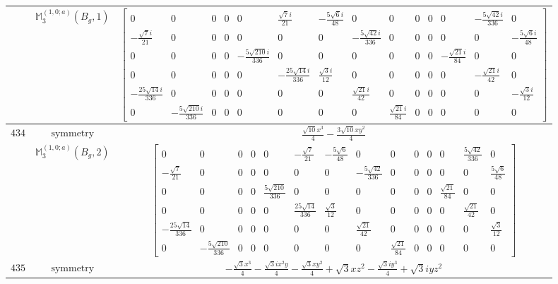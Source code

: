 \documentclass[fleqn,8pt,landscape]{jsarticle}
\begin{document}
\begin{longtable}{ccc}
$  $ & $ \mathbb{M}_{3}^{(1,0;a)}(B_{g},1) $ & $ \begin{bmatrix} 0 & 0 & 0 & 0 & 0 & \frac{\sqrt{7} i}{21} & - \frac{5 \sqrt{6} i}{48} & 0 & 0 & 0 & 0 & 0 & - \frac{5 \sqrt{42} i}{336} & 0 \\ - \frac{\sqrt{7} i}{21} & 0 & 0 & 0 & 0 & 0 & 0 & - \frac{5 \sqrt{42} i}{336} & 0 & 0 & 0 & 0 & 0 & - \frac{5 \sqrt{6} i}{48} \\ 0 & 0 & 0 & 0 & - \frac{5 \sqrt{210} i}{336} & 0 & 0 & 0 & 0 & 0 & 0 & - \frac{\sqrt{21} i}{84} & 0 & 0 \\ 0 & 0 & 0 & 0 & 0 & - \frac{25 \sqrt{14} i}{336} & \frac{\sqrt{3} i}{12} & 0 & 0 & 0 & 0 & 0 & - \frac{\sqrt{21} i}{42} & 0 \\ - \frac{25 \sqrt{14} i}{336} & 0 & 0 & 0 & 0 & 0 & 0 & \frac{\sqrt{21} i}{42} & 0 & 0 & 0 & 0 & 0 & - \frac{\sqrt{3} i}{12} \\ 0 & - \frac{5 \sqrt{210} i}{336} & 0 & 0 & 0 & 0 & 0 & 0 & \frac{\sqrt{21} i}{84} & 0 & 0 & 0 & 0 & 0 \end{bmatrix} $ \\ \hline
$ 434 $ & $ \text{symmetry} $ & $ \frac{\sqrt{10} x^{3}}{4} - \frac{3 \sqrt{10} x y^{2}}{4} $ \\
$  $ & $ \mathbb{M}_{3}^{(1,0;a)}(B_{g},2) $ & $ \begin{bmatrix} 0 & 0 & 0 & 0 & 0 & - \frac{\sqrt{7}}{21} & - \frac{5 \sqrt{6}}{48} & 0 & 0 & 0 & 0 & 0 & \frac{5 \sqrt{42}}{336} & 0 \\ - \frac{\sqrt{7}}{21} & 0 & 0 & 0 & 0 & 0 & 0 & - \frac{5 \sqrt{42}}{336} & 0 & 0 & 0 & 0 & 0 & \frac{5 \sqrt{6}}{48} \\ 0 & 0 & 0 & 0 & \frac{5 \sqrt{210}}{336} & 0 & 0 & 0 & 0 & 0 & 0 & \frac{\sqrt{21}}{84} & 0 & 0 \\ 0 & 0 & 0 & 0 & 0 & \frac{25 \sqrt{14}}{336} & \frac{\sqrt{3}}{12} & 0 & 0 & 0 & 0 & 0 & \frac{\sqrt{21}}{42} & 0 \\ - \frac{25 \sqrt{14}}{336} & 0 & 0 & 0 & 0 & 0 & 0 & \frac{\sqrt{21}}{42} & 0 & 0 & 0 & 0 & 0 & \frac{\sqrt{3}}{12} \\ 0 & - \frac{5 \sqrt{210}}{336} & 0 & 0 & 0 & 0 & 0 & 0 & \frac{\sqrt{21}}{84} & 0 & 0 & 0 & 0 & 0 \end{bmatrix} $ \\ \hline
$ 435 $ & $ \text{symmetry} $ & $ - \frac{\sqrt{3} x^{3}}{4} - \frac{\sqrt{3} i x^{2} y}{4} - \frac{\sqrt{3} x y^{2}}{4} + \sqrt{3} x z^{2} - \frac{\sqrt{3} i y^{3}}{4} + \sqrt{3} i y z^{2} $ \\

\end{longtable}
\end{document}
